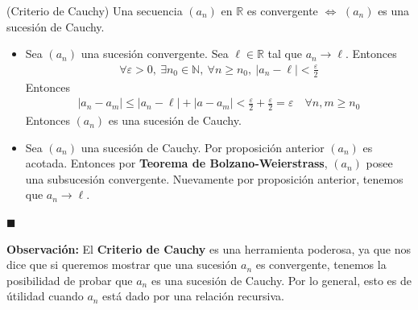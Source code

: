 \documentclass[12pt]{book}
\renewenvironment{proof}[1][\textit{Demostración}]{%
  \par\noindent{\bfseries #1.}\enspace}{\hfill$\blacksquare$\par}
\begin{document}
\begin{teo}{(Criterio de Cauchy)}{}
    Una secuencia $(a_n)$ en $\mathbb{R}$ es convergente $\Longleftrightarrow$ $(a_n)$ es una sucesión de Cauchy.
\end{teo}
\begin{proof}
    \begin{itemize}
        \item[$(\Longrightarrow)$]  Sea $(a_n)$ una sucesión convergente. Sea $\ell \in \mathbb{R}$ tal que $a_n \to \ell$. Entonces
        \begin{align*}
            \forall \varepsilon>0, \ \exists n_0 \in \mathbb{N}, \ \forall n \geq n_0, \ |a_n-\ell| < \frac{\varepsilon}{2} 
        \end{align*}
        Entonces
        \begin{align*}
            |a_n-a_m| \leq |a_n-\ell | +|a-a_m| < \frac{\varepsilon}{2}+\frac{\varepsilon}{2}= \varepsilon \quad \forall n,m \geq n_0
        \end{align*}
        Entonces $(a_n)$ es una sucesión de Cauchy.
        \item[$(\Longleftarrow)$] Sea $(a_n)$ una sucesión de Cauchy. Por proposición anterior $(a_n)$ es acotada. Entonces por \textbf{Teorema de Bolzano-Weierstrass}, $(a_n)$ posee una subsucesión convergente. Nuevamente por proposición anterior, tenemos que $a_n \to \ell$.
    \end{itemize}
\end{proof}

\textbf{Observación:} El \textbf{Criterio de Cauchy} es una herramienta poderosa, ya que nos dice que si queremos mostrar que una sucesión $a_n$ es convergente, tenemos la posibilidad de probar que $a_n$ es una sucesión de Cauchy. Por lo general, esto es  de útilidad cuando $a_n$ está dado por una relación recursiva.
\end{document}
